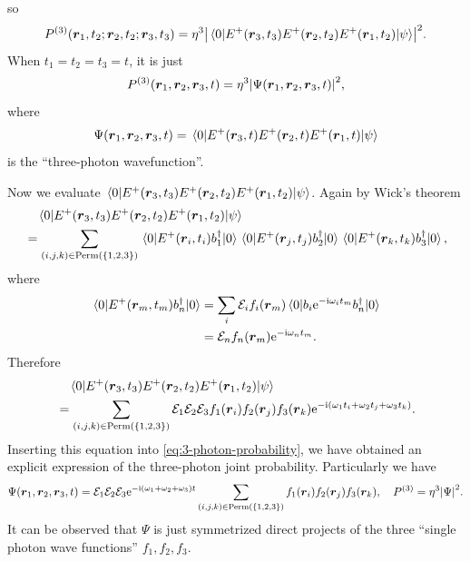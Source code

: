 \documentclass[hyperref, a4paper]{article}
\newcommand*{\ii}{\mathrm{i}}
\newcommand*{\ee}{\mathrm{e}}
\begin{document}
so 
\begin{equation}
    P^{(3)}(\vb*{r}_1, t_2; \vb*{r}_2, t_2; \vb*{r}_3, t_3) = \eta^3 \abs{\mel{0}{E^+(\vb*{r}_3, t_3) E^+(\vb*{r}_2, t_2) E^+(\vb*{r}_1, t_2)}{\psi}}^2.
    \label{eq:3-photon-probability}
\end{equation}
When $t_1 = t_2 = t_3 = t$, it is just 
\begin{equation}
    P^{(3)}(\vb*{r}_1, \vb*{r}_2, \vb*{r}_3, t) = \eta^3 \abs{\Psi(\vb*{r}_1, \vb*{r}_2, \vb*{r}_3, t)}^2,
\end{equation}
where
\begin{equation}
    \Psi(\vb*{r}_1, \vb*{r}_2, \vb*{r}_3, t) = \mel{0}{E^+(\vb*{r}_3, t) E^+(\vb*{r}_2, t) E^+(\vb*{r}_1, t)}{\psi}
\end{equation}
is the ``three-photon wavefunction''.

Now we evaluate $\mel{0}{E^+(\vb*{r}_3, t_3) E^+(\vb*{r}_2, t_2) E^+(\vb*{r}_1, t_2)}{\psi}$. Again by Wick's theorem
\[
    \begin{aligned}
        &\quad \mel{0}{E^+(\vb*{r}_3, t_3) E^+(\vb*{r}_2, t_2) E^+(\vb*{r}_1, t_2)}{\psi} \\
        &= \sum_{(i, j, k) \in \mathrm{Perm}(\{1, 2, 3\})} \mel{0}{E^+(\vb*{r}_i, t_i) b_1^\dagger}{0} \mel{0}{E^+(\vb*{r}_j, t_j) b_2^\dagger}{0} \mel{0}{E^+(\vb*{r}_k, t_k) b_3^\dagger}{0},
    \end{aligned}
\]
where
\[
    \begin{aligned}
        \expval*{E^+(\vb*{r}_m, t_m) b_n^\dagger}{0} &= \sum_i \mathcal{E}_i f_i(\vb*{r}_m) \expval*{b_i \ee^{- \ii \omega_i t_m } b_n^\dagger}{0} \\
        &= \mathcal{E}_n f_n(\vb*{r}_m) \ee^{-\ii \omega_n t_m}.
    \end{aligned}
\]
Therefore 
\begin{equation}
    \begin{aligned}
        &\quad \mel{0}{E^+(\vb*{r}_3, t_3) E^+(\vb*{r}_2, t_2) E^+(\vb*{r}_1, t_2)}{\psi} \\
        &= \sum_{(i, j, k) \in \mathrm{Perm}(\{1, 2, 3\})} \mathcal{E}_1 \mathcal{E}_2 \mathcal{E}_3 f_1(\vb*{r}_i) f_2(\vb*{r}_j) f_3(\vb*{r}_k) \ee^{- \ii (\omega_1 t_i + \omega_2 t_j + \omega_3 t_k)}.
    \end{aligned}
\end{equation}
Inserting this equation into \eqref{eq:3-photon-probability}, we have obtained an explicit expression of the three-photon joint probability.
Particularly we have 
\begin{equation}
    \Psi(\vb*{r}_1, \vb*{r}_2, \vb*{r}_3, t) = \mathcal{E}_1 \mathcal{E}_2 \mathcal{E}_3 \ee^{- \ii (\omega_1 + \omega_2 + \omega_3) t} \sum_{(i, j, k) \in \mathrm{Perm}(\{1, 2, 3\})}  f_1(\vb*{r}_i) f_2(\vb*{r}_j) f_3(\vb*{r}_k), \quad P^{(3)} = \eta^3 \abs{\Psi}^2.
\end{equation}
It can be observed that $\Psi$ is just symmetrized direct projects of the three ``single photon wave functions'' $f_1, f_2, f_3$.
\end{document}
